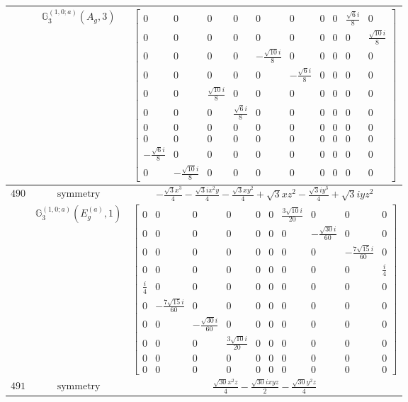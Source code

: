 \documentclass[fleqn,8pt,landscape]{jsarticle}
\begin{document}
\begin{longtable}{ccc}
$  $ & $ \mathbb{G}_{3}^{(1,0;a)}(A_{g},3) $ & $ \begin{bmatrix} 0 & 0 & 0 & 0 & 0 & 0 & 0 & 0 & \frac{\sqrt{6} i}{8} & 0 \\ 0 & 0 & 0 & 0 & 0 & 0 & 0 & 0 & 0 & \frac{\sqrt{10} i}{8} \\ 0 & 0 & 0 & 0 & - \frac{\sqrt{10} i}{8} & 0 & 0 & 0 & 0 & 0 \\ 0 & 0 & 0 & 0 & 0 & - \frac{\sqrt{6} i}{8} & 0 & 0 & 0 & 0 \\ 0 & 0 & \frac{\sqrt{10} i}{8} & 0 & 0 & 0 & 0 & 0 & 0 & 0 \\ 0 & 0 & 0 & \frac{\sqrt{6} i}{8} & 0 & 0 & 0 & 0 & 0 & 0 \\ 0 & 0 & 0 & 0 & 0 & 0 & 0 & 0 & 0 & 0 \\ 0 & 0 & 0 & 0 & 0 & 0 & 0 & 0 & 0 & 0 \\ - \frac{\sqrt{6} i}{8} & 0 & 0 & 0 & 0 & 0 & 0 & 0 & 0 & 0 \\ 0 & - \frac{\sqrt{10} i}{8} & 0 & 0 & 0 & 0 & 0 & 0 & 0 & 0 \end{bmatrix} $ \\ \hline
$ 490 $ & $ \text{symmetry} $ & $ - \frac{\sqrt{3} x^{3}}{4} - \frac{\sqrt{3} i x^{2} y}{4} - \frac{\sqrt{3} x y^{2}}{4} + \sqrt{3} x z^{2} - \frac{\sqrt{3} i y^{3}}{4} + \sqrt{3} i y z^{2} $ \\
$  $ & $ \mathbb{G}_{3}^{(1,0;a)}(E_{g}^{(a)},1) $ & $ \begin{bmatrix} 0 & 0 & 0 & 0 & 0 & 0 & \frac{3 \sqrt{10} i}{20} & 0 & 0 & 0 \\ 0 & 0 & 0 & 0 & 0 & 0 & 0 & - \frac{\sqrt{30} i}{60} & 0 & 0 \\ 0 & 0 & 0 & 0 & 0 & 0 & 0 & 0 & - \frac{7 \sqrt{15} i}{60} & 0 \\ 0 & 0 & 0 & 0 & 0 & 0 & 0 & 0 & 0 & \frac{i}{4} \\ \frac{i}{4} & 0 & 0 & 0 & 0 & 0 & 0 & 0 & 0 & 0 \\ 0 & - \frac{7 \sqrt{15} i}{60} & 0 & 0 & 0 & 0 & 0 & 0 & 0 & 0 \\ 0 & 0 & - \frac{\sqrt{30} i}{60} & 0 & 0 & 0 & 0 & 0 & 0 & 0 \\ 0 & 0 & 0 & \frac{3 \sqrt{10} i}{20} & 0 & 0 & 0 & 0 & 0 & 0 \\ 0 & 0 & 0 & 0 & 0 & 0 & 0 & 0 & 0 & 0 \\ 0 & 0 & 0 & 0 & 0 & 0 & 0 & 0 & 0 & 0 \end{bmatrix} $ \\ \hline
$ 491 $ & $ \text{symmetry} $ & $ \frac{\sqrt{30} x^{2} z}{4} - \frac{\sqrt{30} i x y z}{2} - \frac{\sqrt{30} y^{2} z}{4} $ \\

\end{longtable}
\end{document}
